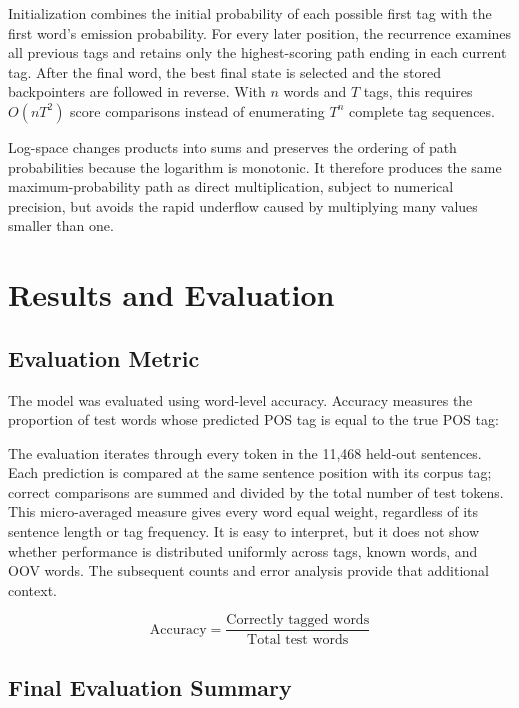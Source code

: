 \documentclass[12pt,a4paper]{article}
\newcommand{\sectionbreakguard}{\Needspace{8\baselineskip}}
\newcommand{\subsectionbreakguard}{\Needspace{7\baselineskip}}
\begin{document}
Initialization combines the initial probability of each possible first tag with
the first word's emission probability. For every later position, the recurrence
examines all previous tags and retains only the highest-scoring path ending in
each current tag. After the final word, the best final state is selected and the
stored backpointers are followed in reverse. With $n$ words and $T$ tags, this
requires $O(nT^2)$ score comparisons instead of enumerating $T^n$ complete tag
sequences.

Log-space changes products into sums and preserves the ordering of path
probabilities because the logarithm is monotonic. It therefore produces the same
maximum-probability path as direct multiplication, subject to numerical
precision, but avoids the rapid underflow caused by multiplying many values
smaller than one.

\sectionbreakguard
\section{Results and Evaluation}

\subsectionbreakguard
\subsection{Evaluation Metric}

The model was evaluated using word-level accuracy. Accuracy measures the
proportion of test words whose predicted POS tag is equal to the true POS tag:

The evaluation iterates through every token in the 11,468 held-out sentences.
Each prediction is compared at the same sentence position with its corpus tag;
correct comparisons are summed and divided by the total number of test tokens.
This micro-averaged measure gives every word equal weight, regardless of its
sentence length or tag frequency. It is easy to interpret, but it does not show
whether performance is distributed uniformly across tags, known words, and OOV
words. The subsequent counts and error analysis provide that additional context.

\begin{equation}
\text{Accuracy} =
\frac{\text{Correctly tagged words}}{\text{Total test words}}
\end{equation}

\subsectionbreakguard
\subsection{Final Evaluation Summary}
\end{document}

